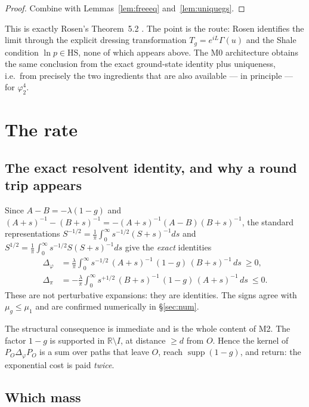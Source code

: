 \documentclass[11pt,a4paper]{article}
\theoremstyle{plain}
\theoremstyle{definition}
\newcommand{\R}{\mathbb{R}}
\DeclareMathOperator{\supp}{supp}
\begin{document}
\begin{proof}
Combine \cite[Thm.~4.2, Cor.~4.4]{M0} with Lemmas~\ref{lem:freeeq} and~\ref{lem:uniquegs}.
\end{proof}

This is exactly Rosen's Theorem~5.2 \cite[\S5]{Rosen72}. The point is the route: Rosen identifies
the limit through the explicit dressing transformation $T_g=e^{iL}\Gamma(u)$ and the Shale
condition $\ln p\in\mathrm{HS}$, none of which appears above. The M0 architecture obtains the same
conclusion from the exact ground-state identity plus uniqueness, i.e.\ from precisely the two
ingredients that are also available --- in principle --- for $\varphi^4_2$.

\section{The rate}\label{sec:rate}

\subsection{The exact resolvent identity, and why a round trip appears}

Since $A-B=-\lambda(1-g)$ and $(A+s)^{-1}-(B+s)^{-1}=-(A+s)^{-1}(A-B)(B+s)^{-1}$, the standard
representations $S^{-1/2}=\frac1\pi\int_0^\infty s^{-1/2}(S+s)^{-1}ds$ and
$S^{1/2}=\frac1\pi\int_0^\infty s^{-1/2}S(S+s)^{-1}ds$ give the \emph{exact} identities
\begin{align}
  \Delta_\varphi &= \frac{\lambda}{\pi}\int_0^\infty s^{-1/2}\,(A+s)^{-1}\,(1-g)\,(B+s)^{-1}\,ds\ \ge 0,
  \label{eq:idphi}\\[2pt]
  \Delta_\pi &= -\frac{\lambda}{\pi}\int_0^\infty s^{+1/2}\,(B+s)^{-1}\,(1-g)\,(A+s)^{-1}\,ds\ \le 0 .
  \label{eq:idpi}
\end{align}
These are not perturbative expansions: they are identities. The signs agree with
$\mu_g\le\mu_1$ and are confirmed numerically in \S\ref{sec:num}.

The structural consequence is immediate and is the whole content of M2. The factor $1-g$ is
supported in $\R\setminus I$, at distance $\ge d$ from $O$. Hence the kernel of
$P_O\Delta_\varphi P_O$ is a sum over paths that leave $O$, reach $\supp(1-g)$, and return: the
exponential cost is paid \emph{twice}.

\subsection{Which mass}
\end{document}
